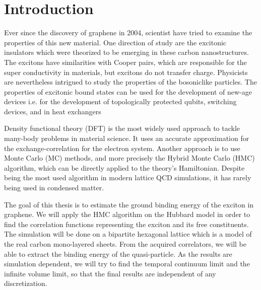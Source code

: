 
\chapter{Introduction}
\label{sec:intro}

Ever since the discovery of graphene in 2004, scientist have tried to examine the properties of this new material. One direction of study are the excitonic insulators which were theorized to be emerging in these carbon nanostructures. The excitons have similarities with Cooper pairs, which are responsible for the super conductivity in materials, but excitons do not transfer charge. Physicists are nevertheless intrigued to study the properties of the bosoniclike particles. The properties of excitonic bound states can be used for the development of new-age devices i.e. for the development of topologically protected qubits, switching devices, and in heat exchangers 

Density functional theory (DFT) is the most widely used approach to tackle many-body problems in material science. It uses an accurate approximation for the exchange-correlation for the electron system. Another approach is to use Monte Carlo (MC) methods, and more precisely the Hybrid Monte Carlo (HMC) algorithm, which can be directly applied to the theory's Hamiltonian. Despite being the most used algorithm in modern lattice  QCD simulations, it has rarely being used in condensed matter.

The goal of this thesis is to estimate the ground binding energy of the exciton in graphene. We will apply the HMC algorithm on the Hubbard model in order to find the correlation functions representing the exciton and its free constituents. The simulation will be done on a bipartite hexagonal lattice which is a model of the real carbon mono-layered sheets. From the acquired correlators, we will be able to extract the binding energy of the quasi-particle. As the results are simulation dependent, we will try to find the temporal continuum limit and the infinite volume limit, so that the final results are independent of any discretization.

